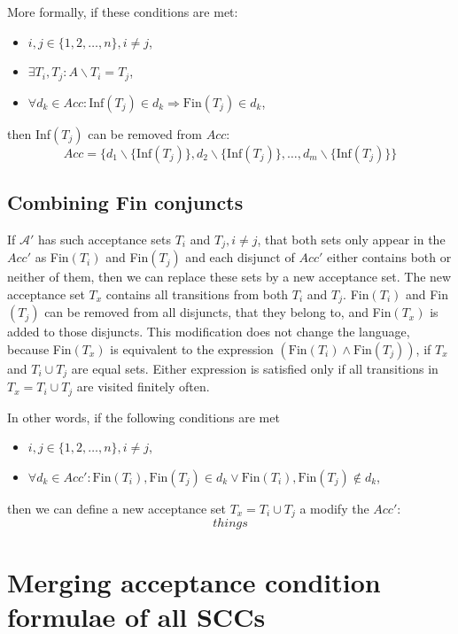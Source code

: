 \documentclass[
  digital, %
  twoside, %
  table,   %
  lof,     %
  lot,     %
]{fithesis3}
\begin{document}
More formally, if these conditions are met:
\begin{itemize}
  \item $i, j \in \{1, 2, \dots, n\} , i \neq j$,
  \item $\exists T_i, T_j \colon A \smallsetminus T_i = T_j$,
  \item $\forall d_k \in Acc \colon \text{Inf}(T_j) \in d_k \Rightarrow \text{Fin}(T_j) \in d_k$,
\end{itemize}
then Inf$(T_j)$ can be removed from $Acc$:
\begin{equation*}
  Acc = \{d_1 \smallsetminus \{\text{Inf}(T_j)\}, d_2 \smallsetminus \{\text{Inf}(T_j)\}, \dots, d_m \smallsetminus \{\text{Inf}(T_j)\} \}
\end{equation*}

\subsection{Combining Fin conjuncts}
If $\mathcal{A'}$ has such acceptance sets $T_i$ and $T_j, i \neq j$, that both sets only appear in the $Acc'$ as Fin$(T_i)$ and Fin$(T_j)$ and each disjunct of $Acc'$ either contains both or neither of them, then we can replace these sets by a new acceptance set. The new acceptance set $T_x$ contains all transitions from both $T_i$ and $T_j$. Fin$(T_i)$ and Fin$(T_j)$ can be removed from all disjuncts, that they belong to, and Fin$(T_x)$ is added to those disjuncts. This modification does not change the language, because Fin$(T_x)$ is equivalent to the expression $(\text{Fin}(T_i) \wedge \text{Fin}(T_j))$, if $T_x$ and $T_i \cup T_j$ are equal sets. Either expression is satisfied only if all transitions in $T_x = T_i \cup T_j$ are visited finitely often.

In other words, if the following conditions are met
\begin{itemize}
  \item $i, j \in \{1, 2, \dots, n\} , i \neq j$,
  \item $\forall d_k \in Acc' \colon \text{Fin}(T_i), \text{Fin}(T_j) \in d_k \vee \text{Fin}(T_i), \text{Fin}(T_j) \notin d_k$,
\end{itemize}
then we can define a new acceptance set $T_x = T_i \cup T_j$ a modify the $Acc'$: 
\begin{equation*}
  things
\end{equation*}

\section{Merging acceptance condition formulae of all SCCs}
\end{document}
